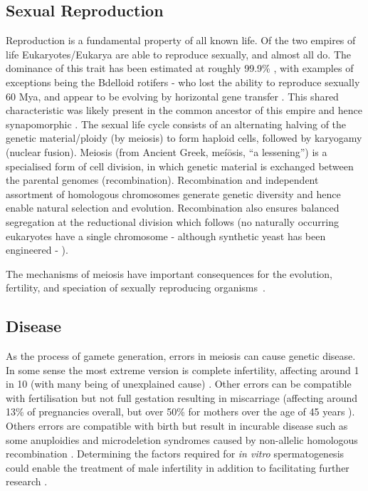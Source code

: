 \subsection{Sexual Reproduction}
Reproduction is a fundamental property of all known life. Of the two empires of life Eukaryotes/Eukarya are able to reproduce sexually, and almost all do. The dominance of this trait has been estimated at roughly 99.9\% \parencite{White1978Modes}, with examples of exceptions being the Bdelloid rotifers - who lost the ability to reproduce sexually 60 Mya, and appear to be evolving by horizontal gene transfer \parencite{Debortoli2016Genetic}. This shared characteristic was likely present in the common ancestor of this empire and hence synapomorphic \parencite{Bernstein2013Evolutionary}. The sexual life cycle consists of an alternating halving of the genetic material/ploidy (by meiosis) to form haploid cells, followed by karyogamy (nuclear fusion). Meiosis (from Ancient Greek, meíōsis, “a lessening”) is a specialised form of cell division, in which genetic material is exchanged between the parental genomes (recombination). Recombination and independent assortment of homologous chromosomes generate genetic diversity and hence enable natural selection and evolution. Recombination also ensures balanced segregation at the reductional division which follows (no naturally occurring eukaryotes have a single chromosome - although synthetic yeast has been engineered - \cite{Shao2018Creating}).

The mechanisms of meiosis have important consequences for the evolution, fertility, and speciation of sexually reproducing organisms~\parencite{Davies2016Reengineering,Hassold2007Origin}. 




\subsection{Disease}
As the process of gamete generation, errors in meiosis can cause genetic disease. In some sense the most extreme version is complete infertility, affecting around 1 in 10 (with many being of unexplained cause) \parencite{Datta2016Prevalence, Hamada2011Unexplained}. Other errors can be compatible with fertilisation but not full gestation resulting in miscarriage (affecting around 13\% of pregnancies overall, but over 50\% for mothers over the age of 45 years \parencite{Magnus2019Role}). Others errors are compatible with birth but result in incurable disease such as some anuploidies \parencite{Hassold2007Origin} and microdeletion syndromes caused by non-allelic homologous recombination \parencite{X}. Determining the factors required for \emph{in vitro} spermatogenesis could enable the treatment of male infertility in addition to facilitating further research \parencite{Zhou2016Complete}.

